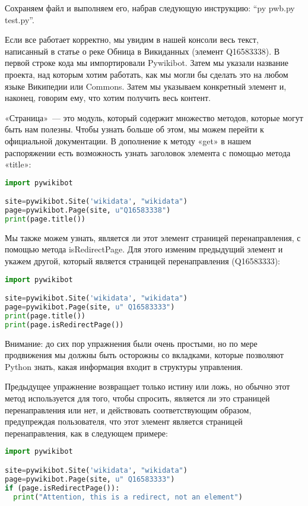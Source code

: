 Сохраняем файл и выполняем его, набрав следующую инструкцию: ``py pwb.py test.py''.

Если все работает корректно, мы увидим в нашей консоли весь текст, написанный в статье о реке Обница в Викиданных (элемент Q16583338). В первой строке кода мы импортировали Pywikibot. Затем мы указали название проекта, над которым хотим работать, как мы могли бы сделать это на любом языке Википедии или Commons. Затем мы указываем конкретный элемент и, наконец, говорим ему, что хотим получить весь контент.

«Страница»~--- это модуль, который содержит множество методов, которые могут быть нам полезны. Чтобы узнать больше об этом, мы можем перейти к официальной документации. В дополнение к методу «get» в нашем распоряжении есть возможность узнать заголовок элемента с помощью метода «title»:

\begin{lstlisting}[language=Python]
import pywikibot

site=pywikibot.Site('wikidata', "wikidata")
page=pywikibot.Page(site, u"Q16583338")
print(page.title())
\end{lstlisting}

Мы также можем узнать, является ли этот элемент страницей перенаправления, с помощью метода isRedirectPage. Для этого изменим предыдущий элемент и укажем другой, который является страницей перенаправления (Q16583333):

\begin{lstlisting}[language=Python]
import pywikibot

site=pywikibot.Site('wikidata', "wikidata")
page=pywikibot.Page(site, u" Q16583333")
print(page.title())
print(page.isRedirectPage())
\end{lstlisting}

Внимание: до сих пор упражнения были очень простыми, но по мере продвижения мы должны быть осторожны со вкладками, которые позволяют Python знать, какая информация входит в структуры управления.

Предыдущее упражнение возвращает только истину или ложь, но обычно этот метод используется для того, чтобы спросить, является ли это страницей перенаправления или нет, и действовать соответствующим образом, предупреждая пользователя, что этот элемент является страницей перенаправления, как в следующем примере:

\begin{lstlisting}[language=Python]
import pywikibot

site=pywikibot.Site('wikidata', "wikidata")
page=pywikibot.Page(site, u" Q16583333")
if (page.isRedirectPage()):
  print("Attention, this is a redirect, not an element")
\end{lstlisting}

